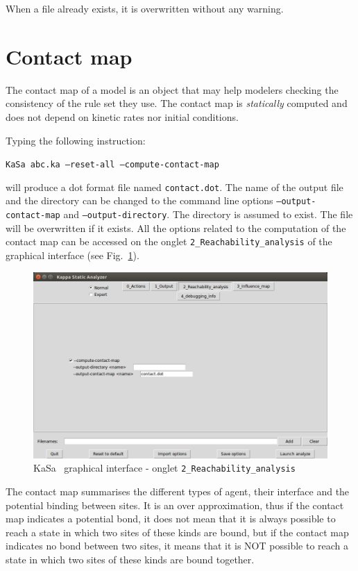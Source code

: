 \documentclass[11pt]{book}
\def\KaSa{\textsf{KaSa}}
\begin{document}
When a file already exists, it is overwritten without any warning. 

\section{Contact map}

The contact map of a model is an object that may help modelers checking the consistency of the rule set they use. The contact map is \emph{statically} computed and does not depend on kinetic rates nor initial conditions.


Typing the following instruction:

\texttt{KaSa abc.ka --reset-all --compute-contact-map}

will produce a dot format file named \texttt{contact.dot}. 
The name of the output file and the directory can be changed to the command line options \texttt{--output-contact-map} and \texttt{--output-directory}. 
The directory is assumed to exist. The file will be overwritten if it exists. All the options related to the computation of the contact map can be accessed on the 
onglet \texttt{2\_Reachability\_analysis} of the graphical interface (see Fig.~\ref{fig:kasa:2}). 

\begin{figure}[htbp]
\centering
\includegraphics[width=12cm,natwidth=920pt,natheight=582pt]{img/kasa_2.png}
\caption{\KaSa~ graphical interface - onglet \texttt{2\_Reachability\_analysis}}
\label{fig:kasa:2}
\end{figure}


The contact map summarises the different types of agent, their interface and the potential binding between sites. It is an over approximation, thus if the contact map indicates a potential bond, it does not mean that it is always possible to reach a state in which two sites of these kinds are bound, but if the contact map indicates no bond between two sites, it means that it is NOT possible to reach a state in which two sites of these kinds are bound together.  
\end{document}

